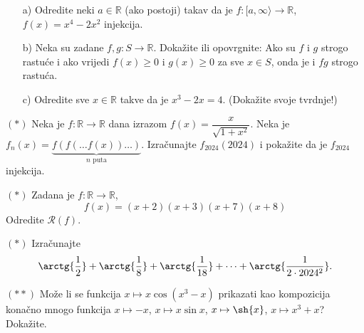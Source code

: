 \begin{exercise} \textbf{}
\begin{itemize}
\item[a)] Odredite neki $a\in\mathbb{R}$ (ako postoji) takav da je $f : [a, \infty\rangle\to \mathbb{R}$, $f(x)=x^4-2x^2$ injekcija.
\item[b)] Neka su zadane $f, g : S\to \mathbb{R}$. Dokažite ili opovrgnite: Ako su $f$ i $g$ strogo rastuće i ako vrijedi $f(x)\geq 0$ i $g(x)\geq 0$ za sve $x\in S$, onda je i $fg$ strogo rastuća.
\item[c)] Odredite sve $x\in \mathbb{R}$ takve da je $x^3-2x=4$. (Dokažite svoje tvrdnje!)
\end{itemize}
\end{exercise}
\begin{exercise} $(*)$
Neka je $f : \mathbb{R}\to \mathbb{R}$ dana izrazom $f(x)=\dfrac{x}{\sqrt{1+x^2}}$. Neka je $f_n(x)=\underbrace{f(f(\dots f(x))\dots)}_\text{$n$ puta}$. Izračunajte $f_{2024}(2024)$ i pokažite da je $f_{2024}$ injekcija.
\end{exercise}
\begin{exercise} $(*)$
Zadana je $f : \mathbb{R}\to \mathbb{R}$,
$$f(x)=(x+2)(x+3)(x+7)(x+8)$$
Odredite $\mathcal{R}(f)$.
\end{exercise}
\begin{exercise} $(*)$ Izračunajte
$$\arctg{\dfrac{1}{2}}+\arctg{\dfrac{1}{8}}+\arctg{\dfrac{1}{18}}+\dots+ \arctg{\dfrac{1}{2\cdot 2024^2}}.$$
\end{exercise}
\begin{exercise} $(**)$
Može li se funkcija $x\mapsto x\cos(x^3-x)$ prikazati kao kompozicija konačno mnogo funkcija $x\mapsto -x$, $x\mapsto x\sin{x}$, $x\mapsto \sh{x}$, $x\mapsto x^3+x$? Dokažite.
\end{exercise}
